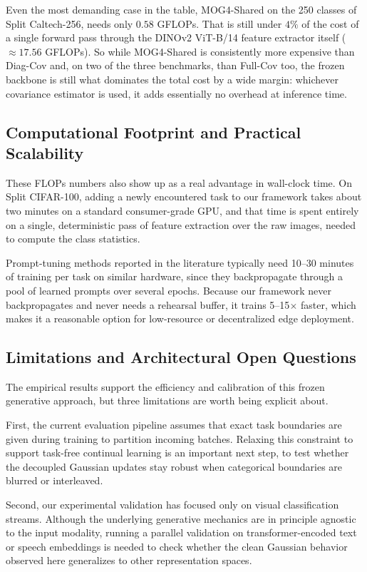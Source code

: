 Even the most demanding case in the table, MOG4-Shared on the 250 classes of Split Caltech-256, needs only $0.58$ GFLOPs. That is still under $4\%$ of the cost of a single forward pass through the DINOv2 ViT-B/14 feature extractor itself ($\approx 17.56$ GFLOPs). So while MOG4-Shared is consistently more expensive than Diag-Cov and, on two of the three benchmarks, than Full-Cov too, the frozen backbone is still what dominates the total cost by a wide margin: whichever covariance estimator is used, it adds essentially no overhead at inference time.

\subsection{Computational Footprint and Practical Scalability}
\label{sec:an:compute}

These FLOPs numbers also show up as a real advantage in wall-clock time. On Split CIFAR-100, adding a newly encountered task to our framework takes about two minutes on a standard consumer-grade GPU, and that time is spent entirely on a single, deterministic pass of feature extraction over the raw images, needed to compute the class statistics.

Prompt-tuning methods reported in the literature typically need 10--30 minutes of training per task on similar hardware, since they backpropagate through a pool of learned prompts over several epochs. Because our framework never backpropagates and never needs a rehearsal buffer, it trains 5--15$\times$ faster, which makes it a reasonable option for low-resource or decentralized edge deployment.

\subsection{Limitations and Architectural Open Questions}
\label{sec:an:limits}

The empirical results support the efficiency and calibration of this frozen generative approach, but three limitations are worth being explicit about.

First, the current evaluation pipeline assumes that exact task boundaries are given during training to partition incoming batches. Relaxing this constraint to support task-free continual learning is an important next step, to test whether the decoupled Gaussian updates stay robust when categorical boundaries are blurred or interleaved.

Second, our experimental validation has focused only on visual classification streams. Although the underlying generative mechanics are in principle agnostic to the input modality, running a parallel validation on transformer-encoded text or speech embeddings is needed to check whether the clean Gaussian behavior observed here generalizes to other representation spaces.

